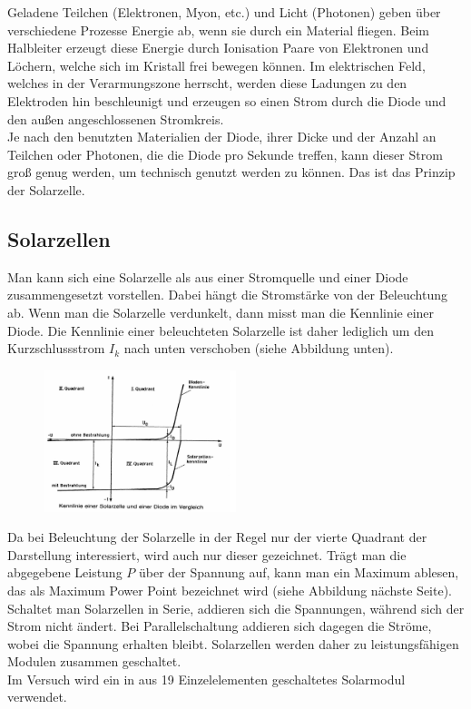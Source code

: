 Geladene Teilchen (Elektronen, Myon, etc.) und Licht (Photonen) geben über verschiedene Prozesse Energie ab, wenn sie durch ein Material fliegen. Beim Halbleiter erzeugt diese Energie durch Ionisation Paare von Elektronen und Löchern, welche sich im Kristall frei bewegen können. Im elektrischen Feld, welches in der Verarmungszone herrscht, werden diese Ladungen zu den Elektroden hin beschleunigt und erzeugen so einen Strom durch die Diode und den außen angeschlossenen Stromkreis.\\
Je nach den benutzten Materialien der Diode, ihrer Dicke und der Anzahl an Teilchen oder Photonen, die die Diode pro Sekunde treffen, kann dieser Strom groß genug werden, um technisch genutzt werden zu können. Das ist das Prinzip der Solarzelle.

\subsection{Solarzellen}

Man kann sich eine Solarzelle als aus einer Stromquelle und einer Diode zusammengesetzt vorstellen. Dabei hängt die Stromstärke von der Beleuchtung ab. Wenn man die Solarzelle verdunkelt, dann misst man die Kennlinie einer Diode. Die Kennlinie einer beleuchteten Solarzelle ist daher lediglich um den Kurzschlussstrom $I_k$ nach unten verschoben (siehe Abbildung unten).\\ %
\begin{figure}[h]
	\centering
		\includegraphics[width=0.5\textwidth]{Abbildungen/Kennlinienfeld.jpg}
	\label{fig:Kennlinienfeld}
\end{figure}

Da bei Beleuchtung der Solarzelle in der Regel nur der vierte Quadrant der Darstellung interessiert, wird auch nur dieser gezeichnet. Trägt man die abgegebene Leistung $P$ über der Spannung auf, kann man ein Maximum ablesen, das als Maximum Power Point bezeichnet wird (siehe Abbildung nächste Seite).\\ %
Schaltet man Solarzellen in Serie, addieren sich die Spannungen, während sich der Strom nicht ändert. Bei Parallelschaltung addieren sich dagegen die Ströme, wobei die Spannung erhalten bleibt. Solarzellen werden daher zu leistungsfähigen Modulen zusammen geschaltet.\\
Im Versuch wird ein in aus 19 Einzelelementen geschaltetes Solarmodul verwendet.

